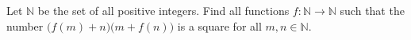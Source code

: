 Let $\mathbb{N}$ be the set of all positive integers. Find all functions $f\colon \mathbb{N} \to \mathbb{N}$ such that the number $\big(f(m)+n\big)\big(m+f(n)\big)$ is a square for all $m,n \in \mathbb{N}$.
